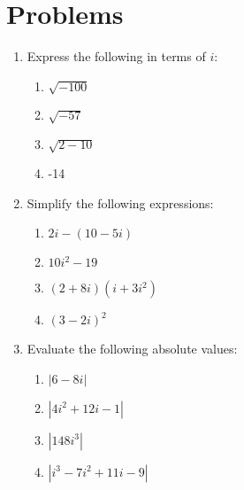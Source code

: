 \documentclass[12pt]{extarticle}
\begin{document}
\section{Problems}
\begin{enumerate}
    \itemsep 2.0em
    \item {Express the following in terms of $i$:
        \begin{enumerate}
            \itemsep 1.0em
            \item {$\sqrt{-100}$} %
            \item {$\sqrt{-57}$} %
            \item {$\sqrt{2-10}$} %
            \item {-14} %
        \end{enumerate}
    }
    \item {Simplify the following expressions:
        \begin{enumerate}
            \itemsep 1.0em
            \item {$2i - (10 - 5i)$} %
            \item {$10i^2 - 19$} %
            \item {$(2+8i)(i+3i^2)$} %
            \item {$(3-2i)^2$} %
        \end{enumerate}
    }
    \item {Evaluate the following absolute values:
        \begin{enumerate}
            \itemsep 1.0em
            \item {$|6-8i|$} %
            \item {$|4i^2+12i-1|$} %
            \item {$|148i^3|$} %
            \item {$|i^3-7i^2+11i-9|$} %

\end{enumerate}}
\end{enumerate}
\end{document}
